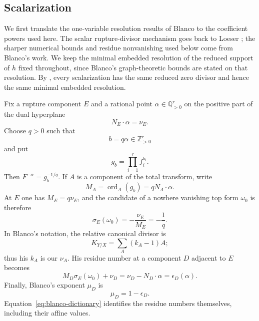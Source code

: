 \documentclass[12pt]{amsart}
\numberwithin{equation}{section}
\theoremstyle{plain}
\theoremstyle{definition}
\theoremstyle{remark}
\theoremstyle{definition}
\DeclareMathOperator{\ord}{ord}
\newcommand{\Q}{\mathbb Q}
\newcommand{\Z}{\mathbb Z}
\begin{document}
\subsection{Scalarization}

We first translate the one-variable resolution results of Blanco \cite{Blanco2026} to the coefficient powers used here. The scalar rupture-divisor mechanism goes back to Loeser \cite[Th\'eor\`eme~III.3.1 and Remarque~III.3.3]{Loeser1988}; the sharper numerical bounds and residue nonvanishing used below come from Blanco's work. We keep the minimal embedded resolution of the reduced support of $h$ fixed throughout, since Blanco's graph-theoretic bounds are stated on that resolution. By , every scalarization has the same reduced zero divisor and hence the same minimal embedded resolution.


Fix a rupture component $E$ and a rational point $\alpha\in\Q_{>0}^r$ on the positive part of the dual hyperplane
\begin{equation*}
N_E\cdot\alpha=\nu_E.
\end{equation*}
Choose $q>0$ such that
\begin{equation*}
b=q\alpha\in\Z_{>0}^r
\end{equation*}
and put
\begin{equation*}
g_b=\prod_{i=1}^r f_i^{b_i}.
\end{equation*}
Then $F^{-\alpha}=g_b^{-1/q}$. If $A$ is a component of the total transform, write
\begin{equation*}
M_A=\ord_A(g_b)=qN_A\cdot\alpha.
\end{equation*}
At $E$ one has $M_E=q\nu_E$, and the candidate of a nowhere vanishing top form $\omega_0$ is therefore
\begin{equation*}
\sigma_E(\omega_0)
 =
 -\frac{\nu_E}{M_E}
 =
 -\frac1q.
\end{equation*}
In Blanco's notation, the relative canonical divisor is
\begin{equation*}
K_{Y/X}=\sum_A(k_A-1)A;
\end{equation*}
thus his $k_A$ is our $\nu_A$. His residue number at a component $D$ adjacent to $E$ becomes
\begin{equation}\label{eq:blanco-dictionary}
 M_D\sigma_E(\omega_0)+\nu_D
 =
 \nu_D-N_D\cdot\alpha
 =
 \epsilon_D(\alpha).
\end{equation}
Finally, Blanco's exponent $\mu_D$ is
\begin{equation*}
\mu_D=1-\epsilon_D.
\end{equation*}
Equation~\eqref{eq:blanco-dictionary} identifies the residue numbers themselves, including their affine values.
\end{document}
